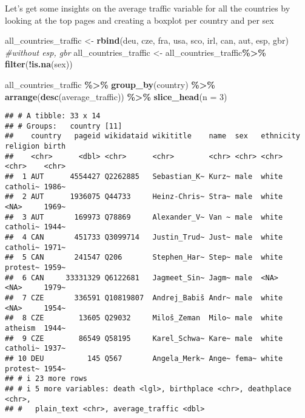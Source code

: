 \documentclass[
]{article}
\newenvironment{Shaded}{\begin{snugshade}}{\end{snugshade}}
\newcommand{\AttributeTok}[1]{\textcolor[rgb]{0.13,0.29,0.53}{#1}}
\newcommand{\CommentTok}[1]{\textcolor[rgb]{0.56,0.35,0.01}{\textit{#1}}}
\newcommand{\DecValTok}[1]{\textcolor[rgb]{0.00,0.00,0.81}{#1}}
\newcommand{\FunctionTok}[1]{\textcolor[rgb]{0.13,0.29,0.53}{\textbf{#1}}}
\newcommand{\NormalTok}[1]{#1}
\newcommand{\OtherTok}[1]{\textcolor[rgb]{0.56,0.35,0.01}{#1}}
\newcommand{\SpecialCharTok}[1]{\textcolor[rgb]{0.81,0.36,0.00}{\textbf{#1}}}
\begin{document}
Let's get some insights on the average traffic variable for all the
countries by looking at the top pages and creating a boxplot per country
and per sex

\begin{Shaded}
\begin{Highlighting}[]
\NormalTok{all\_countries\_traffic }\OtherTok{\textless{}{-}} \FunctionTok{rbind}\NormalTok{(deu, cze, fra, usa, sco, irl, can, aut, esp, gbr) }\CommentTok{\#without esp, gbr }
\NormalTok{all\_countries\_traffic }\OtherTok{\textless{}{-}}\NormalTok{ all\_countries\_traffic}\SpecialCharTok{\%\textgreater{}\%}
  \FunctionTok{filter}\NormalTok{(}\SpecialCharTok{!}\FunctionTok{is.na}\NormalTok{(sex))}


\NormalTok{all\_countries\_traffic }\SpecialCharTok{\%\textgreater{}\%}
  \FunctionTok{group\_by}\NormalTok{(country) }\SpecialCharTok{\%\textgreater{}\%}
  \FunctionTok{arrange}\NormalTok{(}\FunctionTok{desc}\NormalTok{(average\_traffic)) }\SpecialCharTok{\%\textgreater{}\%}
  \FunctionTok{slice\_head}\NormalTok{(}\AttributeTok{n =} \DecValTok{3}\NormalTok{)}
\end{Highlighting}
\end{Shaded}

\begin{verbatim}
## # A tibble: 33 x 14
## # Groups:   country [11]
##    country   pageid wikidataid wikititle    name  sex   ethnicity religion birth
##    <chr>      <dbl> <chr>      <chr>        <chr> <chr> <chr>     <chr>    <chr>
##  1 AUT      4554427 Q2262885   Sebastian_K~ Kurz~ male  white     catholi~ 1986~
##  2 AUT      1936075 Q44733     Heinz-Chris~ Stra~ male  white     <NA>     1969~
##  3 AUT       169973 Q78869     Alexander_V~ Van ~ male  white     catholi~ 1944~
##  4 CAN       451733 Q3099714   Justin_Trud~ Just~ male  white     catholi~ 1971~
##  5 CAN       241547 Q206       Stephen_Har~ Step~ male  white     protest~ 1959~
##  6 CAN     33331329 Q6122681   Jagmeet_Sin~ Jagm~ male  <NA>      <NA>     1979~
##  7 CZE       336591 Q10819807  Andrej_Babiš Andr~ male  white     <NA>     1954~
##  8 CZE        13605 Q29032     Miloš_Zeman  Milo~ male  white     atheism  1944~
##  9 CZE        86549 Q58195     Karel_Schwa~ Kare~ male  white     catholi~ 1937~
## 10 DEU          145 Q567       Angela_Merk~ Ange~ fema~ white     protest~ 1954~
## # i 23 more rows
## # i 5 more variables: death <lgl>, birthplace <chr>, deathplace <chr>,
## #   plain_text <chr>, average_traffic <dbl>
\end{verbatim}
\end{document}
